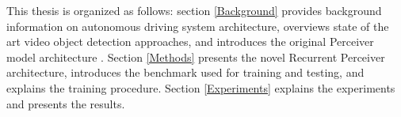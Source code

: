 This thesis is organized as follows: section \ref{Background} provides background information on autonomous driving system architecture, overviews state of the art video object detection approaches, and introduces the original Perceiver model architecture \cite{jaeglePerceiverGeneralPerception2021}. Section \ref{Methods} presents the novel Recurrent Perceiver architecture, introduces the benchmark used for training and testing, and explains the training procedure. Section \ref{Experiments} explains the experiments and presents the results.


